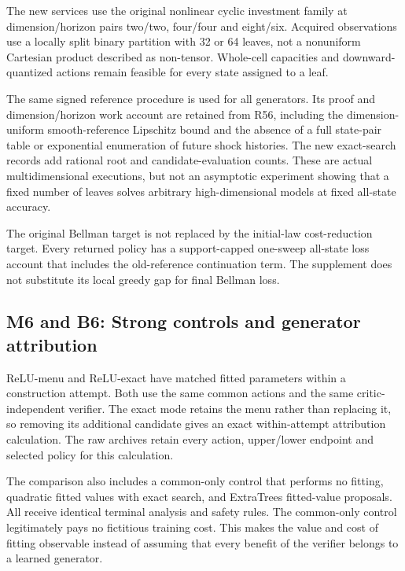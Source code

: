 The new services use the original nonlinear cyclic investment family at
dimension/horizon pairs two/two, four/four and eight/six. Acquired
observations use a locally split binary partition with 32 or 64 leaves,
not a nonuniform Cartesian product described as non-tensor. Whole-cell
capacities and downward-quantized actions remain feasible for every
state assigned to a leaf.

The same signed reference procedure is used for all generators. Its
proof and dimension/horizon work account are retained from R56,
including the dimension-uniform smooth-reference Lipschitz bound and the
absence of a full state-pair table or exponential enumeration of future
shock histories. The new exact-search records add rational root and
candidate-evaluation counts. These are actual multidimensional
executions, but not an asymptotic experiment showing that a fixed number
of leaves solves arbitrary high-dimensional models at fixed all-state
accuracy.

The original Bellman target is not replaced by the initial-law
cost-reduction target. Every returned policy has a support-capped
one-sweep all-state loss account that includes the old-reference
continuation term. The supplement does not substitute its local greedy
gap for final Bellman loss.

\hypertarget{m6-and-b6-strong-controls-and-generator-attribution}{%
\subsection{M6 and B6: Strong controls and generator
attribution}\label{m6-and-b6-strong-controls-and-generator-attribution}}

ReLU-menu and ReLU-exact have matched fitted parameters within a
construction attempt. Both use the same common actions and the same
critic-independent verifier. The exact mode retains the menu rather than
replacing it, so removing its additional candidate gives an exact
within-attempt attribution calculation. The raw archives retain every
action, upper/lower endpoint and selected policy for this calculation.

The comparison also includes a common-only control that performs no
fitting, quadratic fitted values with exact search, and ExtraTrees
fitted-value proposals. All receive identical terminal analysis and
safety rules. The common-only control legitimately pays no fictitious
training cost. This makes the value and cost of fitting observable
instead of assuming that every benefit of the verifier belongs to a
learned generator.

